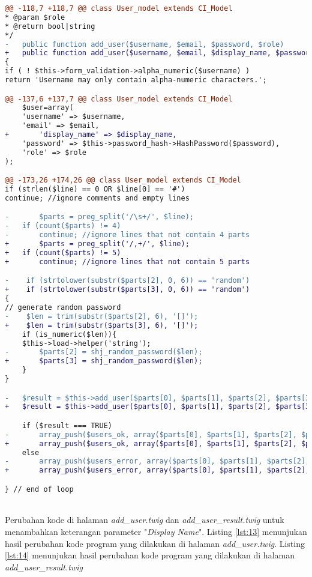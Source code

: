 \begin{lstlisting}[language=diff, caption=Perubahan kode program pada \textit{User\_model.php}, label=lst:12, basicstyle=\ttfamily, frame=single,
columns=fullflexible, keepspaces=true, breaklines=true]
@@ -118,7 +118,7 @@ class User_model extends CI_Model
* @param $role
* @return bool|string
*/
-   public function add_user($username, $email, $password, $role)
+   public function add_user($username, $email, $display_name, $password, $role)
{
if ( ! $this->form_validation->alpha_numeric($username) )
return 'Username may only contain alpha-numeric characters.';

@@ -137,6 +137,7 @@ class User_model extends CI_Model
	$user=array(
	'username' => $username,
	'email' => $email,
+   	'display_name' => $display_name,
	'password' => $this->password_hash->HashPassword($password),
	'role' => $role
);

@@ -173,26 +174,26 @@ class User_model extends CI_Model
if (strlen($line) == 0 OR $line[0] == '#')
continue; //ignore comments and empty lines

-       $parts = preg_split('/\s+/', $line);
-   if (count($parts) != 4)
-   	continue; //ignore lines that not contain 4 parts
+       $parts = preg_split('/,+/', $line);
+   if (count($parts) != 5)
+       continue; //ignore lines that not contain 5 parts

-    if (strtolower(substr($parts[2], 0, 6)) == 'random')
+    if (strtolower(substr($parts[3], 0, 6)) == 'random')
{
// generate random password
-    $len = trim(substr($parts[2], 6), '[]');
+    $len = trim(substr($parts[3], 6), '[]');
	if (is_numeric($len)){
	$this->load->helper('string');
-   	$parts[2] = shj_random_password($len);
+       $parts[3] = shj_random_password($len);
	}
}

-   $result = $this->add_user($parts[0], $parts[1], $parts[2], $parts[3]);
+   $result = $this->add_user($parts[0], $parts[1], $parts[2], $parts[3], $parts[4]);

	if ($result === TRUE)
-   	array_push($users_ok, array($parts[0], $parts[1], $parts[2], $parts[3]));
+       array_push($users_ok, array($parts[0], $parts[1], $parts[2], $parts[3], $parts[4]));
	else
-       array_push($users_error, array($parts[0], $parts[1], $parts[2], $parts[3], $result));
+       array_push($users_error, array($parts[0], $parts[1], $parts[2], $parts[3], $parts[4], $result));

} // end of loop
\end{lstlisting}
~\\
Perubahan kode di halaman \textit{add\_user.twig} dan \textit{add\_user\_result.twig} untuk menambahkan keterangan parameter "\textit{Display Name}". Listing \ref{lst:13} menunjukan hasil perubahan kode program yang dilakukan di halaman \textit{add\_user.twig}. Listing \ref{lst:14} menunjukan hasil perubahan kode program yang dilakukan di halaman \textit{add\_user\_result.twig}

